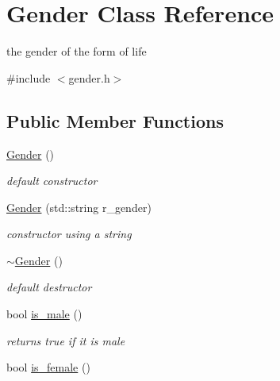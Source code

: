 \hypertarget{classGender}{
\section{Gender Class Reference}
\label{classGender}
}


the gender of the form of life  




{\ttfamily \#include $<$gender.h$>$}

\subsection*{Public Member Functions}
\begin{DoxyCompactItemize}
\item 
\hyperlink{classGender_a90e371a0a09819d60c2452238988262f}{Gender} ()
\begin{DoxyCompactList}\small\item\em default constructor \end{DoxyCompactList}\item 
\hyperlink{classGender_a359546875d33cef5599e85e58c15d8e0}{Gender} (std::string r\_\-gender)
\begin{DoxyCompactList}\small\item\em constructor using a string \end{DoxyCompactList}\item 
\hypertarget{classGender_a7ad7a7514711926743c9117dcbdefe04}{
\hyperlink{classGender_a7ad7a7514711926743c9117dcbdefe04}{$\sim$Gender} ()}
\label{classGender_a7ad7a7514711926743c9117dcbdefe04}

\begin{DoxyCompactList}\small\item\em default destructor \end{DoxyCompactList}\item 
\hypertarget{classGender_ac2ea0b219f63dddd3c8ec4511d942e38}{
bool \hyperlink{classGender_ac2ea0b219f63dddd3c8ec4511d942e38}{is\_\-male} ()}
\label{classGender_ac2ea0b219f63dddd3c8ec4511d942e38}

\begin{DoxyCompactList}\small\item\em returns true if it is male \end{DoxyCompactList}\item 
\hypertarget{classGender_a7618eefc206851181be4ac406482189e}{
bool \hyperlink{classGender_a7618eefc206851181be4ac406482189e}{is\_\-female} ()}
\label{classGender_a7618eefc206851181be4ac406482189e}


\end{DoxyCompactItemize}
